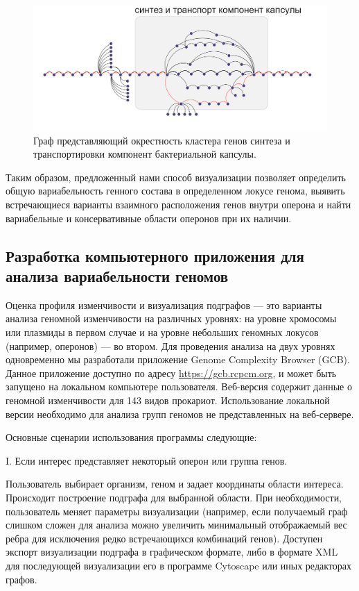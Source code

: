 \begin{figure}[!ht] 
  \center
    \includegraphics[width=\textwidth]{Dissertation/images/subgraphs/capsular_subgraph.png}
  \caption{Граф представляющий окрестность кластера генов синтеза и транспортировки компонент бактериальной капсулы. }
  \label{img:capsule_sub_small} 
\end{figure}

Таким образом, предложенный нами способ визуализации позволяет определить общую вариабельность генного состава в определенном локусе генома, выявить встречающиеся варианты взаимного расположения генов внутри оперона и найти вариабельные и консервативные области оперонов при их наличии.

\subsection*{Разработка компьютерного приложения для анализа вариабельности геномов} \label{chaptGCB}

Оценка профиля изменчивости и визуализация подграфов --- это варианты анализа геномной изменчивости на различных уровнях: на уровне хромосомы или плазмиды в первом случае и на уровне небольших геномных локусов (например, оперонов) --- во втором. Для проведения анализа на двух уровнях одновременно мы разработали приложение Genome Complexity Browser (GCB). Данное приложение доступно по адресу \url{https://gcb.rcpcm.org}, и может быть запущено на локальном компьютере пользователя. Веб-версия содержит данные о геномной изменчивости для 143 видов прокариот. Использование локальной версии необходимо для анализа групп геномов не представленных на веб-сервере.

Основные сценарии использования программы следующие:

I. Если интерес представляет некоторый оперон или группа генов.

Пользователь выбирает организм, геном и задает координаты области интереса. Происходит построение подграфа для выбранной области. При необходимости, пользователь меняет параметры визуализации (например, если получаемый граф слишком сложен для анализа можно увеличить минимальный отображаемый вес ребра для исключения редко встречающихся комбинаций генов). Доступен экспорт визуализации подграфа в графическом формате, либо в формате XML для последующей визуализации его в программе Cytoscape или иных редакторах графов. 

